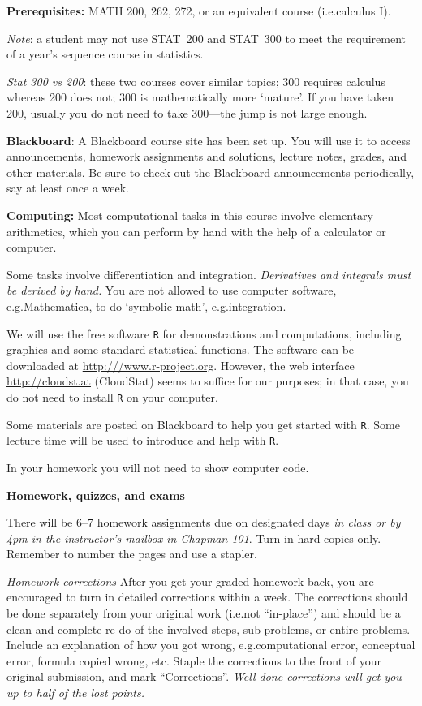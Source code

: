 \documentclass{article}
\begin{document}
\bigskip
\textbf{\large Prerequisites:}
MATH 200, 262, 272, or an equivalent course (i.e.\@ calculus I).

\emph{Note}: a student may not use STAT~200 and STAT~300 to meet the
requirement of a year's sequence course in statistics.

\emph{Stat 300 vs 200}: these two courses cover similar topics; 300 requires
calculus whereas 200 does not; 300 is mathematically more `mature'. If
you have taken 200, usually
you do not need to take 300---the jump is not large enough.


\bigskip
\textbf{\large Blackboard}:
A Blackboard course site has been set up. You will use it to access
announcements,
homework assignments and solutions,
lecture notes,
grades, and
other materials.
Be sure to check out the Blackboard announcements periodically,
say at least once a week.

\bigskip
\textbf{\large Computing:}
Most computational tasks in this course involve elementary arithmetics,
which you can perform by hand with the help of a calculator or computer.

Some tasks involve differentiation and integration.
\emph{Derivatives and integrals must be derived by hand.}
You are not allowed to use computer software, e.g.\@ Mathematica,
to do `symbolic math', e.g.\@ integration.

We will use the free software \texttt{R} for demonstrations and
computations, including graphics and some standard statistical
functions.
The software can be downloaded at \url{http:///www.r-project.org}.
However, the web interface \url{http://cloudst.at} (CloudStat)
seems to suffice for our purposes;
in that case, you do not need to install \texttt{R} on your computer.

Some materials are posted on Blackboard to help you get started with
\texttt{R}. Some lecture time will be used to introduce and help with
\texttt{R}.

In your homework you will not need to show computer code.

\bigskip
\textbf{\large Homework, quizzes, and exams}

There will be 6--7 homework assignments due on designated days
\emph{in class or by 4pm in the instructor's mailbox in Chapman 101}.
Turn in hard copies only.
Remember to number the pages and use a stapler.

\emph{Homework corrections}
After you get your graded homework back, you are encouraged to
turn in detailed corrections within a week.
The corrections should be done separately from your original work
(i.e.\@ not ``in-place'') and should be a clean and complete
re-do of the involved steps, sub-problems, or entire problems.
Include an explanation of how you got wrong, e.g.\@ computational
error, conceptual error, formula copied wrong, etc.
Staple the corrections to the front of your original submission,
and mark ``Corrections''.
\emph{Well-done corrections will get you up to half of the lost
points.}
\end{document}
